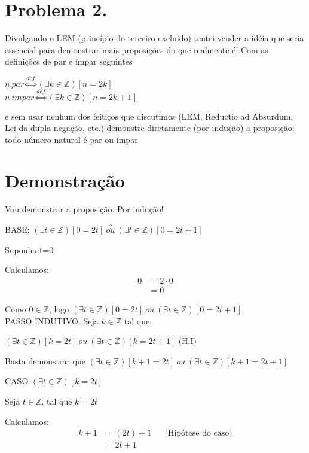 \documentclass[a4paper]{article}
\def\ints{{\mathbb Z}}
\def\by#1{&& \text{(#1)}\\}
\def\halmos{ \begin{flushright} \RectangleBold \end{flushright}}
\begin{document}
 \halmos
 \newpage
 \section*{Problema 2.}
 Divulgando o LEM (princípio do terceiro excluido) tentei vender a idéia que seria essencial para demonstrar
mais proposições do que realmente é! Com as definições de par e ímpar seguintes
\begin{center}
$n \ par \stackrel{def}{\iff} (\exists k \in \ints)[n=2k]$ \\
$n \ impar \stackrel{def}{\iff} (\exists k \in \ints)[n=2k+1]$
\end{center}
e sem usar nenhum dos feitiços que discutimos (LEM, Reductio ad Absurdum, Lei da dupla negação, etc.)
demonstre diretamente (por indução) a proposição: todo número natural é par ou ímpar

\section*{Demonstração} 

Vou demonstrar a proposição.\newline
Por indução!

BASE: $(\exists t \in \ints)[0=2t] \ \stackrel{?}{ou} \ (\exists t \in \ints)[0=2t+1] $ 

Suponha t=0

Calculamos:
\begin{align*}
0& = 2\cdot0 \\
& = 0  
\end{align*}

Como $0\in \ints$, logo $(\exists t \in \ints)[0=2t] \ ou \ (\exists t \in \ints)[0=2t+1] $\\


PASSO INDUTIVO. Seja $k\in \ints$ tal que:

\begin{center}$(\exists t \in \ints)[k=2t] \ ou \ (\exists t \in \ints)[k=2t+1] $  (H.I)\end{center}

Basta demonstrar que $(\exists t \in \ints)[k+1=2t] \ ou \ (\exists t \in \ints)[k+1=2t+1] $ \newline

CASO  $(\exists t \in \ints)[k=2t]$

Seja $t\in \ints$, tal que $k=2t$

Calculamos:
\begin{align*}
k+1& = (2t)+1           \by {Hipótese do caso} 
& =2t+1   
\end{align*}
\end{document}
